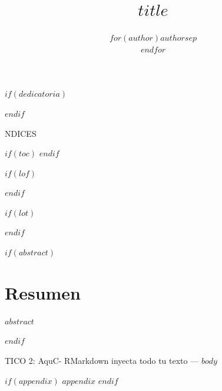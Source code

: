 \documentclass[oneside,11pt]{Latex/Classes/PhDthesisPSnPDF}
\title{$title$}
\author{$for(author)$$author$$sep$ \\ $endfor$}
\begin{document}
\maketitle

\frontmatter

$if(dedicatoria)$

$endif$

NDICES                         %
\setcounter{secnumdepth}{3}
\setcounter{tocdepth}{3}

$if(toc)$
\tableofcontents
$endif$

$if(lof)$
\listoffigures
$endif$

$if(lot)$
\listoftables
$endif$

\cleardoublepage

$if(abstract)$
  \cleardoublepage       %
  \chapter*{Resumen}     %
  
  $abstract$             %
  
  \cleardoublepage
$endif$

\mainmatter
\def\baselinestretch{1.5}

TICO 2: AquC- RMarkdown inyecta todo tu texto ---
$body$

\renewcommand{\bibname}{Lista de Referencias}
 
 

$if(appendix)$
\appendix
$appendix$
$endif$
\end{document}

